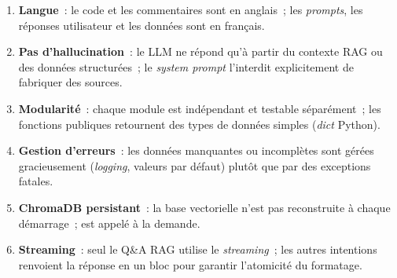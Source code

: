 \begin{enumerate}
  \item \textbf{Langue}~: le code et les commentaires sont en anglais~; les \textit{prompts}, les réponses utilisateur et les données sont en français.
  \item \textbf{Pas d'hallucination}~: le \ac{LLM} ne répond qu'à partir du contexte \ac{RAG} ou des données structurées~; le \textit{system prompt} l'interdit explicitement de fabriquer des sources.
  \item \textbf{Modularité}~: chaque module est indépendant et testable séparément~; les fonctions publiques retournent des types de données simples (\textit{dict} Python).
  \item \textbf{Gestion d'erreurs}~: les données manquantes ou incomplètes sont gérées gracieusement (\textit{logging}, valeurs par défaut) plutôt que par des exceptions fatales.
  \item \textbf{ChromaDB persistant}~: la base vectorielle n'est pas reconstruite à chaque démarrage~;  est appelé à la demande.
  \item \textbf{Streaming}~: seul le Q\&A \ac{RAG} utilise le \textit{streaming}~; les autres intentions renvoient la réponse en un bloc pour garantir l'atomicité du formatage.
\end{enumerate}
